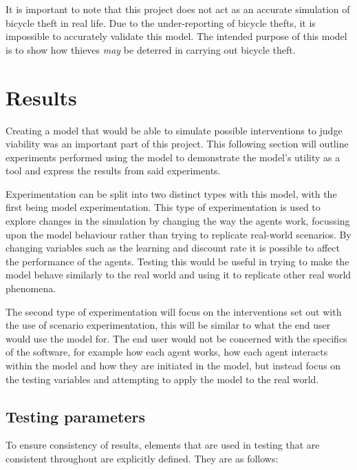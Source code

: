 \documentclass[11pt]{informatics-report}
\begin{document}
It is important to note that this project does not act as an accurate simulation of bicycle theft in real life. Due to the under-reporting of bicycle thefts, it is impossible to accurately validate this model. The intended purpose of this model is to show how thieves \textit{may} be deterred in carrying out bicycle theft. 

\chapter{Results}
Creating a model that would be able to simulate possible interventions to judge viability was an important part of this project. This following section will outline experiments performed using the model to demonstrate the model's utility as a tool and express the results from said experiments. \par

Experimentation can be split into two distinct types with this model, with the first being model experimentation. This type of experimentation is used to explore changes in the simulation by changing the way the agents work, focussing upon the model behaviour rather than trying to replicate real-world scenarios. By changing variables such as the learning and discount rate it is possible to affect the performance of the agents. Testing this would be useful in trying to make the model behave similarly to the real world and using it to replicate other real world phenomena. \par

The second type of experimentation will focus on the interventions set out with the use of scenario experimentation, this will be similar to what the end user would use the model for. The end user would not be concerned with the specifics of the software, for example how each agent works, how each agent interacts within the model and how they are initiated in the model, but instead focus on the testing variables and attempting to apply the model to the real world.

\section{Testing parameters}
To ensure consistency of results, elements that are used in testing that are consistent throughout are explicitly defined. They are as follows:
\end{document}

